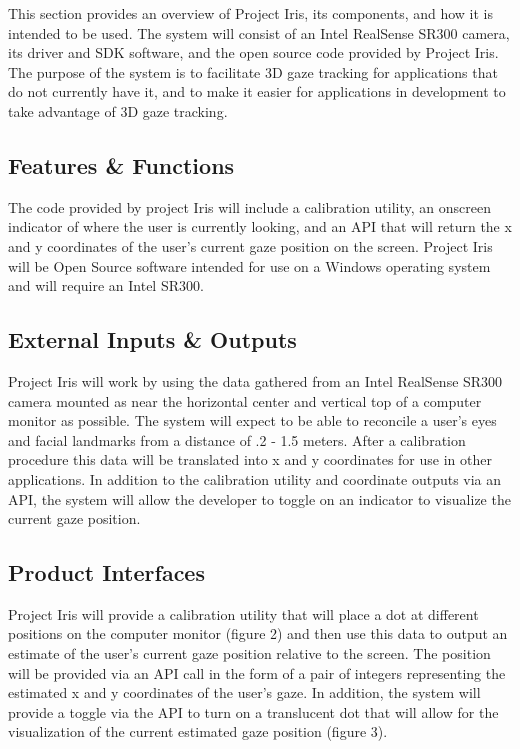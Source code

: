 This section provides an overview of Project Iris, its components, and how it is intended to be used. The system will consist of an Intel RealSense SR300 camera, its driver and SDK software, and the open source code provided by Project Iris. The purpose of the system is to facilitate 3D gaze tracking for applications that do not currently have it, and to make it easier for applications in development to take advantage of 3D gaze tracking. 

\subsection{Features \& Functions}
The code provided by project Iris will include a calibration utility, an onscreen indicator of where the user is currently looking, and an API that will return the x and y coordinates of the user's current gaze position on the screen. Project Iris will be Open Source software intended for use on a Windows operating system and will require an Intel SR300.

\subsection{External Inputs \& Outputs}
Project Iris will work by using the data gathered from an Intel RealSense SR300 camera mounted as near the horizontal center and vertical top of a computer monitor as possible. The system will expect to be able to reconcile a user's eyes and facial landmarks from a distance of .2 - 1.5 meters. After a calibration procedure this data will be translated into x and y coordinates for use in other applications. In addition to the calibration utility and coordinate outputs via an API, the system will allow the developer to toggle on an indicator to visualize the current gaze position.

\subsection{Product Interfaces}
Project Iris will provide a calibration utility that will place a dot at different positions on the computer monitor (figure 2) and then use this data to output an estimate of the user's current gaze position relative to the screen. The position will be provided via an API call in the form of a pair of integers representing the estimated x and y coordinates of the user's gaze. In addition, the system will provide a toggle via the API to turn on a translucent dot that will allow for the visualization of the current estimated gaze position (figure 3).

